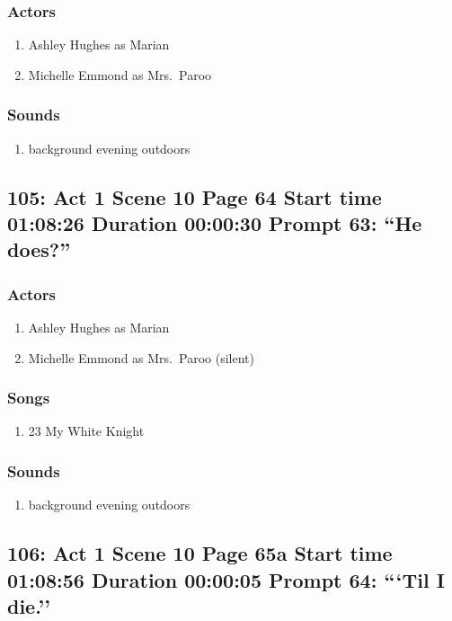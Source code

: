 \subsubsection{Actors}
\begin{enumerate}
\item Ashley Hughes as Marian
\item Michelle Emmond as Mrs.~Paroo
\end{enumerate}

\subsubsection{Sounds}
\begin{enumerate}
\item background evening outdoors
\end{enumerate}
\subsection{105: Act 1 Scene 10 Page 64 Start time 01:08:26 Duration 00:00:30 Prompt 63: ``He does?''}

\subsubsection{Actors}
\begin{enumerate}
\item Ashley Hughes as Marian
\item Michelle Emmond as Mrs.~Paroo (silent)
\end{enumerate}

\subsubsection{Songs}
\begin{enumerate}
\item 23 My White Knight
\end{enumerate}\subsubsection{Sounds}
\begin{enumerate}
\item background evening outdoors
\end{enumerate}
\subsection{106: Act 1 Scene 10 Page 65a Start time 01:08:56 Duration 00:00:05 Prompt 64: ```Til I die.''}
